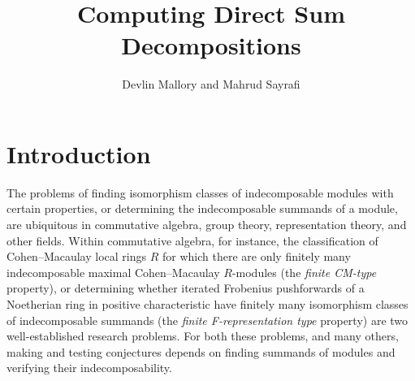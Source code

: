 \documentclass{article}
\title{Computing Direct Sum Decompositions}
\author{Devlin Mallory and Mahrud Sayrafi}
\numberwithin{equation}{section}
\theoremstyle{theorem}
\numberwithin{thm}{section}
\theoremstyle{definition}
\begin{document}
\maketitle





\section{Introduction}


The problems of finding isomorphism classes of indecomposable modules with certain properties, or determining the indecomposable summands of a module, are ubiquitous in commutative algebra, group theory, representation theory, and other fields. Within commutative algebra, for instance, the classification of Cohen--Macaulay local rings $R$ for which there are only finitely many indecomposable maximal Cohen--Macaulay $R$-modules (the \emph{finite CM-type} property), or determining whether iterated Frobenius pushforwards of a Noetherian ring in positive characteristic have finitely many isomorphism classes of indecomposable summands (the \emph{finite F-representation type} property) are two well-established research problems. For both these problems, and many others, making and testing conjectures depends on finding summands of modules and verifying their indecomposability.
\end{document}

